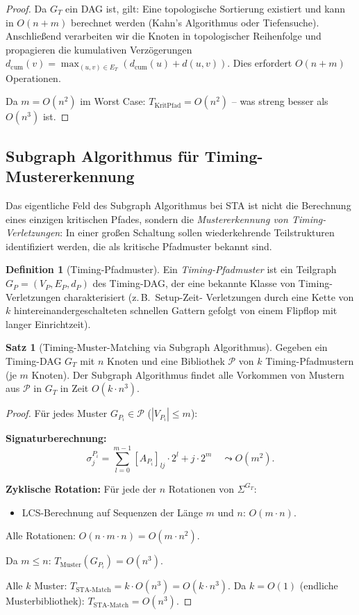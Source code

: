 ﻿\documentclass[a4paper,12pt]{article}
\theoremstyle{definition}
\newtheorem{definition}{Definition}
\newtheorem{satz}{Satz}
\begin{document}
\begin{proof}
  Da $G_T$ ein DAG ist, gilt: Eine topologische Sortierung existiert und kann in $O(n + m)$
  berechnet werden (Kahn's Algorithmus oder Tiefensuche). Anschließend verarbeiten wir
  die Knoten in topologischer Reihenfolge und propagieren die kumulativen Verzögerungen
  $d_{\text{cum}}(v) = \max_{(u,v) \in E_T} (d_{\text{cum}}(u) + d(u,v))$.
  Dies erfordert $O(n + m)$ Operationen.

  Da $m = O(n^2)$ im Worst Case: $T_{\text{KritPfad}} = O(n^2)$ -- was streng besser als
  $O(n^3)$ ist.
\end{proof}

\subsection{Subgraph Algorithmus für Timing-Mustererkennung}

Das eigentliche Feld des Subgraph Algorithmus bei STA ist nicht die Berechnung eines
einzigen kritischen Pfades, sondern die \emph{Mustererkennung von Timing-Verletzungen}:
In einer großen Schaltung sollen wiederkehrende Teilstrukturen identifiziert werden,
die als kritische Pfadmuster bekannt sind.

\begin{definition}[Timing-Pfadmuster]\label{def:tpm}
  Ein \emph{Timing-Pfadmuster} ist ein Teilgraph $G_P = (V_P, E_P, d_P)$ des Timing-DAG,
  der eine bekannte Klasse von Timing-Verletzungen charakterisiert (z.\,B.\ Setup-Zeit-
  Verletzungen durch eine Kette von $k$ hintereinandergeschalteten schnellen Gattern
  gefolgt von einem Flipflop mit langer Einrichtzeit).
\end{definition}

\begin{satz}[Timing-Muster-Matching via Subgraph Algorithmus]\label{satz:timing_match}
  Gegeben ein Timing-DAG $G_T$ mit $n$ Knoten und eine Bibliothek $\mathcal{P}$
  von $k$ Timing-Pfadmustern (je $m$ Knoten). Der Subgraph Algorithmus findet alle
  Vorkommen von Mustern aus $\mathcal{P}$ in $G_T$ in Zeit $O(k \cdot n^3)$.
\end{satz}

\begin{proof}
  Für jedes Muster $G_{P_i} \in \mathcal{P}$ ($|V_{P_i}| \leq m$):

  \textbf{Signaturberechnung:}
  \[
    \sigma_j^{P_i} = \sum_{l=0}^{m-1} [A_{P_i}]_{lj} \cdot 2^l + j \cdot 2^m
    \quad \leadsto O(m^2).
  \]

  \textbf{Zyklische Rotation:} Für jede der $n$ Rotationen von $\Sigma^{G_T}$:
  \begin{itemize}
    \item LCS-Berechnung auf Sequenzen der Länge $m$ und $n$: $O(m \cdot n)$.
  \end{itemize}
  Alle Rotationen: $O(n \cdot m \cdot n) = O(m \cdot n^2)$.

  Da $m \leq n$: $T_{\text{Muster}}(G_{P_i}) = O(n^3)$.

  Alle $k$ Muster: $T_{\text{STA-Match}} = k \cdot O(n^3) = O(k \cdot n^3)$.
  Da $k = O(1)$ (endliche Musterbibliothek): $T_{\text{STA-Match}} = O(n^3)$.
\end{proof}
\end{document}
